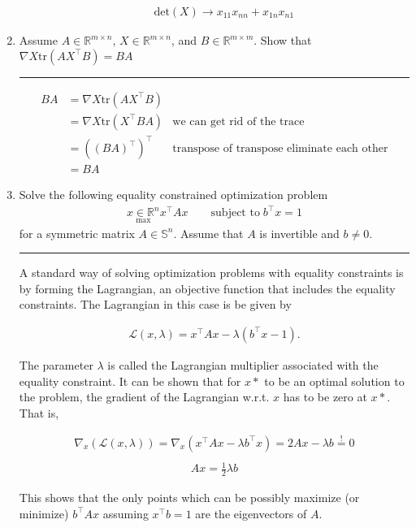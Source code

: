 \documentclass[12pt]{article}
\begin{document}
\begin{enumerate}
\begin{enumerate}
        \begin{align*}
            \textrm{det}(X) \rightarrow x_{11} x_{nn} + x_{1n}x_{n1}
        \end{align*}

    \end{enumerate}   
    
    \item Assume $A \in \mathbb{R}^{m \times n} $, $X \in \mathbb{R}^{m \times n} $, and $B \in \mathbb{R}^{m \times m} $. Show that $\nabla X \textrm{tr}(AX^\intercal B) = BA$
    
    \noindent\rule{\linewidth}{1pt}
    \begin{align*}
        BA &= \nabla X \textrm{tr}(AX^\intercal B) \\
           &= \nabla X \textrm{tr}(X^\intercal BA) & \textrm{we can get rid of the trace}\\
           &= ((BA)^\intercal )^\intercal  & \textrm{transpose of transpose eliminate each other}\\
           &= BA
    \end{align*}

    \item Solve the following equality constrained optimization problem
    \begin{align*}
        \underset{\textrm{max}}{x \in \mathbb{R}^n} x^\intercal Ax \qquad \textrm{subject to} \; b^\intercal x=1
    \end{align*}
    for a symmetric matrix $A \in \mathbb{S}^n $. Assume that $A$ is invertible and $b \neq 0$. 

    \noindent\rule{\linewidth}{1pt}

    A standard way of solving optimization problems with equality constraints is by
    forming the Lagrangian, an objective function that includes the equality constraints.
    The Lagrangian in this case is be given by

    \begin{align*}
        \mathcal{L}(x, \lambda) = x^\intercal Ax - \lambda(b^\intercal x - 1).
    \end{align*}

    The parameter $\lambda$ is called the Lagrangian multiplier associated with the equality
    constraint. It can be shown that for $x*$ to be an optimal solution to the problem,
    the gradient of the Lagrangian w.r.t. $x$ has to be zero at $x*$. That is,

    \begin{align*}
        \nabla_x (\mathcal{L}(x, \lambda)) = \nabla_x (x^\intercal Ax - \lambda b^\intercal x) = 2Ax - \lambda b \overset{!}{=} 0 \\
    \end{align*}
    \begin{align*}
        Ax = \frac{1}{2} \lambda b
    \end{align*}
    
    This shows that the only points which can be possibly maximize (or minimize)
    $b^\intercal Ax$ assuming $x^\intercal b = 1$ are the eigenvectors of $A$.

\end{enumerate}
\end{document}
